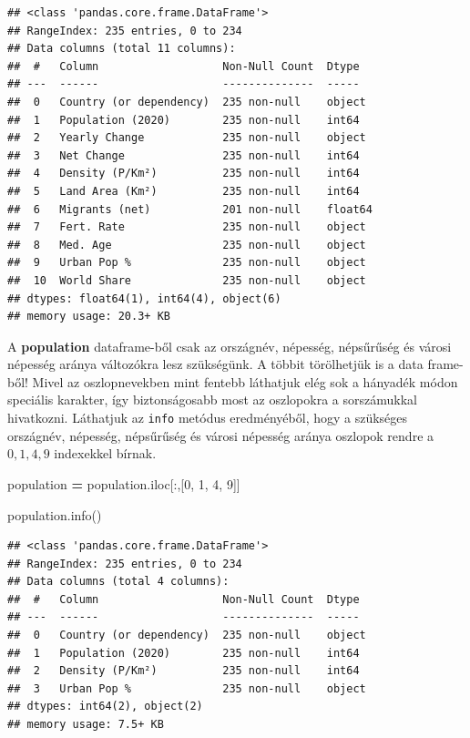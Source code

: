 \documentclass[
]{book}
\newenvironment{Shaded}{\begin{snugshade}}{\end{snugshade}}
\newcommand{\DecValTok}[1]{\textcolor[rgb]{0.00,0.00,0.81}{#1}}
\newcommand{\NormalTok}[1]{#1}
\newcommand{\OperatorTok}[1]{\textcolor[rgb]{0.81,0.36,0.00}{\textbf{#1}}}
\begin{document}
\begin{verbatim}
## <class 'pandas.core.frame.DataFrame'>
## RangeIndex: 235 entries, 0 to 234
## Data columns (total 11 columns):
##  #   Column                   Non-Null Count  Dtype  
## ---  ------                   --------------  -----  
##  0   Country (or dependency)  235 non-null    object 
##  1   Population (2020)        235 non-null    int64  
##  2   Yearly Change            235 non-null    object 
##  3   Net Change               235 non-null    int64  
##  4   Density (P/Km²)          235 non-null    int64  
##  5   Land Area (Km²)          235 non-null    int64  
##  6   Migrants (net)           201 non-null    float64
##  7   Fert. Rate               235 non-null    object 
##  8   Med. Age                 235 non-null    object 
##  9   Urban Pop %              235 non-null    object 
##  10  World Share              235 non-null    object 
## dtypes: float64(1), int64(4), object(6)
## memory usage: 20.3+ KB
\end{verbatim}

A \textbf{population} dataframe-ből csak az országnév, népesség, népsűrűség és városi népesség aránya változókra lesz szükségünk.
A többit törölhetjük is a data frame-ből! Mivel az oszlopnevekben mint fentebb láthatjuk elég sok a hányadék módon speciális karakter, így biztonságosabb most az oszlopokra a sorszámukkal hivatkozni. Láthatjuk az \texttt{info} metódus eredményéből, hogy a szükséges országnév, népesség, népsűrűség és városi népesség aránya oszlopok rendre a \(0,1,4,9\) indexekkel bírnak.

\begin{Shaded}
\begin{Highlighting}[]
\NormalTok{population }\OperatorTok{=}\NormalTok{ population.iloc[:,[}\DecValTok{0}\NormalTok{, }\DecValTok{1}\NormalTok{, }\DecValTok{4}\NormalTok{, }\DecValTok{9}\NormalTok{]]}

\NormalTok{population.info()}
\end{Highlighting}
\end{Shaded}

\begin{verbatim}
## <class 'pandas.core.frame.DataFrame'>
## RangeIndex: 235 entries, 0 to 234
## Data columns (total 4 columns):
##  #   Column                   Non-Null Count  Dtype 
## ---  ------                   --------------  ----- 
##  0   Country (or dependency)  235 non-null    object
##  1   Population (2020)        235 non-null    int64 
##  2   Density (P/Km²)          235 non-null    int64 
##  3   Urban Pop %              235 non-null    object
## dtypes: int64(2), object(2)
## memory usage: 7.5+ KB
\end{verbatim}
\end{document}
